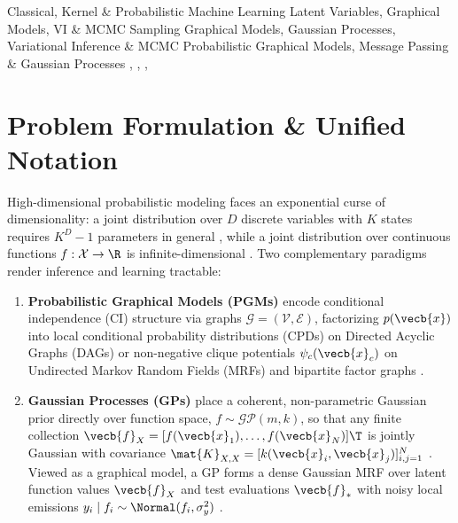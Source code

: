 \documentclass[../../../../master.tex]{subfiles}
\begin{document}
\monographleaf
  {Classical, Kernel \& Probabilistic Machine Learning}
  {Latent Variables, Graphical Models, VI \& MCMC Sampling}
  {Graphical Models, Gaussian Processes, Variational Inference \& MCMC}
  {Probabilistic Graphical Models, Message Passing \& Gaussian Processes}
  {, , , }

\sloppy

\section{Problem Formulation \& Unified Notation}
\label{sec:pgmgp:formulation}

High-dimensional probabilistic modeling faces an exponential curse of dimensionality: a joint distribution over $D$ discrete variables with $K$ states requires $K^D - 1$ parameters in general , while a joint distribution over continuous functions $f: \mathcal{X} \to \R$ is infinite-dimensional . Two complementary paradigms render inference and learning tractable:
\begin{enumerate}
  \item \textbf{Probabilistic Graphical Models (PGMs)} encode conditional independence (CI) structure via graphs $\mathcal{G} = (\mathcal{V}, \mathcal{E})$, factorizing $p(\vecb{x})$ into local conditional probability distributions (CPDs) on Directed Acyclic Graphs (DAGs) or non-negative clique potentials $\psi_c(\vecb{x}_c)$ on Undirected Markov Random Fields (MRFs) and bipartite factor graphs .
  \item \textbf{Gaussian Processes (GPs)} place a coherent, non-parametric Gaussian prior directly over function space, $f \sim \mathcal{GP}(m, k)$, so that any finite collection $\vecb{f}_X = [f(\vecb{x}_1),\dots,f(\vecb{x}_N)]\T$ is jointly Gaussian with covariance $\mat{K}_{X,X} = [k(\vecb{x}_i, \vecb{x}_j)]_{i,j=1}^N$ . Viewed as a graphical model, a GP forms a dense Gaussian MRF over latent function values $\vecb{f}_X$ and test evaluations $\vecb{f}_*$ with noisy local emissions $y_i \mid f_i \sim \Normal(f_i, \sigma_y^2)$ .
\end{enumerate}
\end{document}
